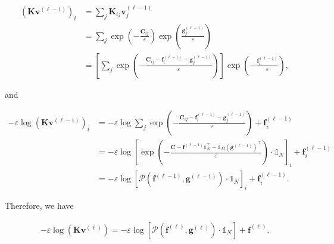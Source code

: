 \begin{equation*}
  \begin{aligned}
    \left(\mathbf{K}\mathbf{v}^{(\ell-1)}\right)_i
     & = \sum_j \mathbf{K}_{ij} \mathbf{v}_j^{(\ell-1)}                                                                      \\
     & = \sum_j \exp(-\frac{\mathbf{C}_{ij}}{\varepsilon}) \exp(\frac{\mathbf{g}_j^{(\ell-1)}}{\varepsilon})                 \\
     & = \left[\sum_j \exp(- \frac{\mathbf{C}_{ij} - \mathbf{f}_i^{(\ell-1)} - \mathbf{g}_j^{(\ell-1)}}{\varepsilon})\right]
    \exp(-\frac{\mathbf{f}_i^{(\ell-1)}}{\varepsilon}),
  \end{aligned}
\end{equation*}

and

\begin{equation*}
  \begin{aligned}
    -\varepsilon\log \left(\mathbf{K} \mathbf{v}^{(\ell-1)}\right)_i
     & =
    -\varepsilon\log \sum_j \exp(- \frac{\mathbf{C}_{ij} - \mathbf{f}_i^{(\ell-1)} - \mathbf{g}_j^{(\ell-1)}}{\varepsilon})
    + \mathbf{f}_i^{(\ell-1)} \\
     & =
    -\varepsilon\log \left[
      \exp \left(
      -\frac{\mathbf{C} - \mathbf{f}^{(\ell-1)} \mathbb{1}_N^\top - \mathbb{1}_M (\mathbf{g}^{(\ell-1)})^\top}{\varepsilon}
      \right)
      \cdot \mathbb{1}_N
      \right]_i
    + \mathbf{f}_i^{(\ell-1)} \\
     & =
    -\varepsilon\log
    \left[
      \mathcal{P} \left(\mathbf{f}^{(\ell-1)}, \mathbf{g}^{(\ell-1)}\right)\cdot \mathbb{1}_N
      \right]_i + \mathbf{f}_i^{(\ell-1)}.
  \end{aligned}
\end{equation*}

Therefore, we have

\begin{equation}\label{eqn:neg-log-kv-vec}
  \begin{aligned}
    - \varepsilon \log \left(\mathbf{K} \mathbf{v}^{(\ell)}\right)
    = - \varepsilon \log \left[
      \mathcal{P} \left(\mathbf{f}^{(\ell)}, \mathbf{g}^{(\ell)}\right)\cdot \mathbb{1}_N
      \right] + \mathbf{f}^{(\ell)}.
  \end{aligned}
\end{equation}

